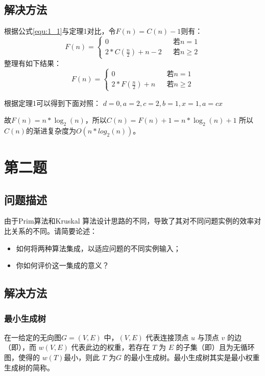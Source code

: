 \documentclass[cs4size, punct, nospace, fancyhdr, fntef, UTF8]{ctexart}
\begin{document}
  \subsection{解决方法}
  根据公式\ref{equ:1_1}与定理1对比，令$F(n)=C(n)-1$则有：
  \begin{equation}\label{equ_1_4}
    F(n)=\left\{
      \begin{array}{lcl}
        {0}                             &      & {若n=1}\\
        {2*C(\frac{n}{2}) + n - 2}      &      & {若n\geq 2}
      \end{array} \right.
  \end{equation}
  整理有如下结果：
  \begin{equation}\label{equ_1_5}
    F(n)=\left\{
      \begin{array}{lcl}
        {0}                         &      & {若n=1}\\
        {2*F(\frac{n}{2}) + n}      &      & {若n\geq 2}
      \end{array} \right.
  \end{equation}

  根据定理1可以得到下面对照：
  $d = 0,a = 2, c = 2, b = 1, x = 1, a = cx$

  故$F(n)=n*\log_2(n)$，所以$C(n)=F(n) + 1=n*\log_2(n) + 1$
  所以$C(n)$的渐进复杂度为$O(n*log_2(n))$。


  \section{第二题}
  \subsection{问题描述}
  由于Prim算法和Kruskal 算法设计思路的不同，导致了其对不同问题实例的效率对比关系的不同。请简要论述：
  \begin{itemize}
    \item 如何将两种算法集成，以适应问题的不同实例输入；
    \item 你如何评价这一集成的意义？
  \end{itemize}
  \subsection{解决方法}
  \subsubsection{最小生成树}
  在一给定的无向图$G = \left(V, E\right)$ 中，$\left(V, E\right)$ 代表连接顶点 $u$ 与顶点 $v$ 的边（即），而 $w\left(V, E\right)$ 代表此边的权重，若存在 $T$ 为 $E$ 的子集（即）且为无循环图，使得的 $w\left(T\right)$最小，则此 $T$ 为$G$ 的最小生成树。最小生成树其实是最小权重生成树的简称。
\end{document}
